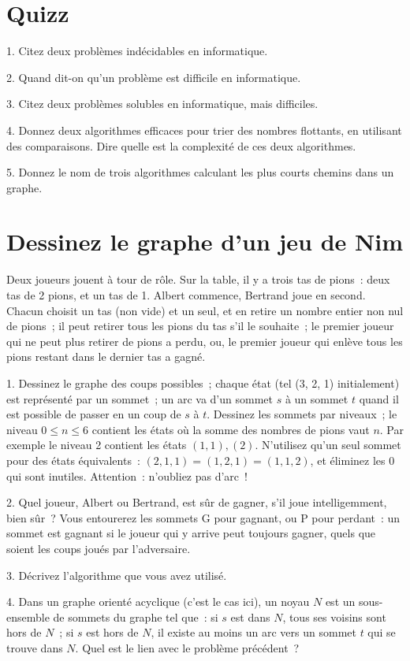 \documentclass[11pt]{article}
\begin{document}
\section{Quizz}

1. Citez deux problèmes indécidables en informatique.

2. Quand dit-on qu'un problème est difficile en informatique.

3. Citez deux problèmes solubles en informatique, mais difficiles.

4. Donnez deux algorithmes efficaces pour trier des nombres flottants, en utilisant des comparaisons. Dire quelle est la complexité de ces deux algorithmes.

5. Donnez le nom de trois algorithmes calculant les plus courts chemins dans un graphe.


\section{Dessinez le graphe d'un jeu de Nim}
Deux joueurs jouent à tour de rôle. Sur la table, il y a trois tas de pions~:
deux tas de 2 pions, et un tas de 1.
Albert commence, Bertrand joue en second. Chacun choisit un tas (non vide) et  un seul,
et en retire un nombre entier  non nul  de pions~; il peut retirer  tous les pions du tas s'il le souhaite~; le premier joueur qui ne peut plus retirer de pions
a perdu, ou, le premier joueur qui enlève tous les pions restant dans le dernier tas a gagné. 

1. Dessinez le graphe des coups possibles~; chaque état (tel (3, 2, 1) initialement) est représenté par un sommet~; un arc va d'un sommet $s$ à un sommet $t$ quand il est possible de passer en un coup de $s$ à $t$. 
Dessinez les sommets par niveaux~; le niveau $0 \le n \le 6 $ contient les états où la somme des nombres de pions vaut $n$. Par exemple le niveau 2 contient
les états $(1, 1), (2)$. N'utilisez qu'un seul sommet pour des états équivalents~: $(2, 1, 1)=(1, 2, 1)=(1, 1, 2)$, et éliminez les $0$ qui sont inutiles. Attention~: n'oubliez pas d'arc~!

2. Quel joueur, Albert ou Bertrand, est sûr de gagner, s'il joue intelligemment, bien sûr~? Vous entourerez les sommets G pour gagnant, ou P pour perdant~: un sommet est gagnant si le joueur qui y arrive peut toujours gagner, quels que soient les coups joués par l'adversaire. 

3. Décrivez l'algorithme que vous avez utilisé.


4. Dans un graphe orienté acyclique (c'est le cas ici), un noyau $N$ est 
un sous-ensemble de sommets du graphe tel que~: si $s$ est dans $N$, tous ses voisins sont hors de $N$~; si $s$ est hors de $N$, il existe au moins un arc vers un sommet $t$ qui se trouve dans $N$. Quel est le lien avec le problème précédent~? 
\end{document}
